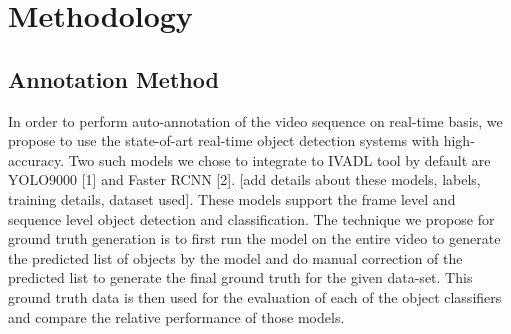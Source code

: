 \documentclass[conference]{IEEEtran}
\begin{document}

\section{Methodology}
\subsection{Annotation Method} \label{sec.annotation}
In order to perform auto-annotation of the video sequence on real-time basis, we propose to use the state-of-art real-time object detection systems with high-accuracy. 
Two such models we chose to integrate to IVADL tool by default are YOLO9000 [1] and Faster RCNN [2]. [add details about these models, labels, training details, dataset used]. 
These models support the frame level and sequence level object detection and classification. 
The technique we propose for ground truth generation is to first run the model on the entire video to generate the predicted list of objects by the model and do manual correction of the predicted list to generate the final ground truth for the given data-set. 
This ground truth data is then used for the evaluation of each of the object classifiers and compare the relative performance of those models. \par
\end{document}
